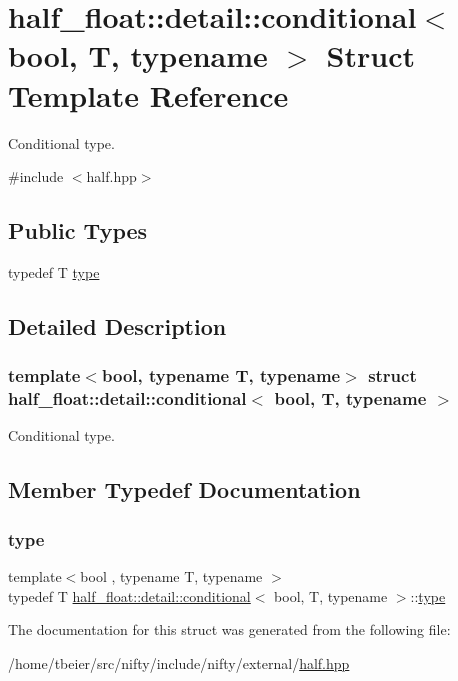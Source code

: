 \hypertarget{structhalf__float_1_1detail_1_1conditional}{}\section{half\+\_\+float\+:\+:detail\+:\+:conditional$<$ bool, T, typename $>$ Struct Template Reference}
\label{structhalf__float_1_1detail_1_1conditional}


Conditional type.  




{\ttfamily \#include $<$half.\+hpp$>$}

\subsection*{Public Types}
\begin{DoxyCompactItemize}
\item 
typedef T \hyperlink{structhalf__float_1_1detail_1_1conditional_ace7680db9fa44adf899e0133f39a43b6}{type}
\end{DoxyCompactItemize}


\subsection{Detailed Description}
\subsubsection*{template$<$bool, typename T, typename$>$\newline
struct half\+\_\+float\+::detail\+::conditional$<$ bool, T, typename $>$}

Conditional type. 

\subsection{Member Typedef Documentation}
\mbox{\label{structhalf__float_1_1detail_1_1conditional_ace7680db9fa44adf899e0133f39a43b6}} 
\subsubsection{\texorpdfstring{type}{type}}
{\footnotesize\ttfamily template$<$bool , typename T, typename $>$ \\
typedef T \hyperlink{structhalf__float_1_1detail_1_1conditional}{half\+\_\+float\+::detail\+::conditional}$<$ bool, T, typename $>$\+::\hyperlink{structhalf__float_1_1detail_1_1conditional_ace7680db9fa44adf899e0133f39a43b6}{type}}



The documentation for this struct was generated from the following file\+:\begin{DoxyCompactItemize}
\item 
/home/tbeier/src/nifty/include/nifty/external/\hyperlink{half_8hpp}{half.\+hpp}\end{DoxyCompactItemize}
